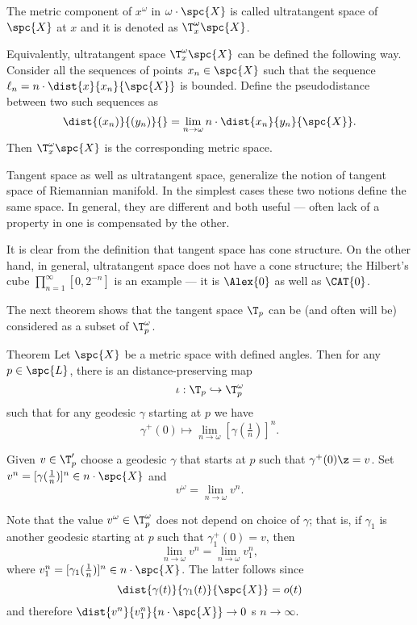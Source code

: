 The metric component of $x^\omega$ in $\omega\cdot\spc{X}$ is called ultratangent space of $\spc{X}$ at $x$ and it is denoted as $\T^\omega_x\spc{X}$.

Equivalently, ultratangent space $\T^\omega_x\spc{X}$ can be defined the following way.
Consider all the sequences of points $x_n\in \spc{X}$ such that
the sequence $\ell_n=n\cdot\dist{x}{x_n}{\spc{X}}$ is bounded.
Define the pseudodistance between two such sequences as 
\[\dist{(x_n)}{(y_n)}{}
=
\lim_{n\to\omega}n\cdot\dist{x_n}{y_n}{\spc{X}}.\]
Then $\T^\omega_x\spc{X}$ is the corresponding metric space.

Tangent space as well as ultratangent space, 
generalize the notion of tangent space of Riemannian manifold.
In the simplest cases these two notions define the same space.
In general, they are different and both useful ---
often lack of a property in one is compensated by the other.

It is clear from the definition that tangent space has cone structure.
On the other hand, in general, ultratangent space does not have a cone structure; 
the Hilbert's cube $\prod_{n=1}^\infty[0,2^{-n}]$ is an example --- it is $\Alex{0}$ as well as $\CAT{0}$.

The next theorem shows that the tangent space $\T_p$ can be (and often will be) considered as a subset of  $\T^\omega_p$.

\begin{thm}{Theorem}\label{thm:tangent-ultratangent}
\label{thm:T-in-T^w} 
Let $\spc{X}$ be a metric space with defined angles.
Then for any $p\in \spc{L}$, there is an distance-preserving map 
\[\iota:\T_p\hookrightarrow \T^\omega_p\] 
such that for any geodesic $\gamma$ starting at $p$
we have 
\[\gamma^+(0)\mapsto \lim_{n\to\omega}[\gamma(\tfrac1n)]^n.\]

\end{thm}

Given $v\in \T'_p$ 
choose a geodesic $\gamma$ that starts at $p$ such that $\gamma^+(0)\z=v$.
Set $v^n=[\gamma(\tfrac1n)]^n\in n\cdot \spc{X}$ and 
\[v^\omega=\lim_{n\to\omega}v^n.\]

Note that the value $v^\omega\in\T^\omega_p$ does not depend on choice of $\gamma$;
that is, if $\gamma_1$ is another geodesic starting at $p$ such that $\gamma_1^+(0)=v$,
then 
\[\lim_{n\to\omega}v^n=\lim_{n\to\omega}v_1^n,\]
where $v_1^n=[\gamma_1(\tfrac1n)]^n\in n\cdot \spc{X}$.
The latter follows since
\[\dist{\gamma(t)}{\gamma_1(t)}{\spc{X}}=o(t)\]
and therefore $\dist{v^n}{v_1^n}{n\cdot \spc{X}}\to 0$ s $n\to\infty$.



